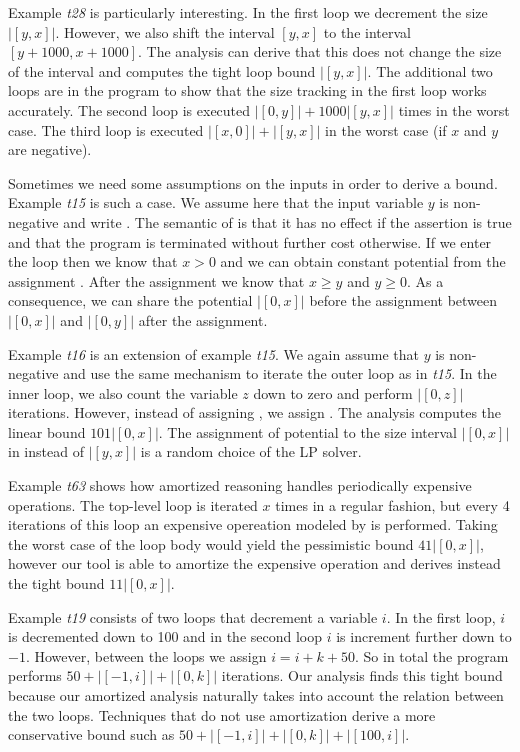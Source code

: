 \documentclass[nocopyrightspace,preprint,pldi]{sigplanconf-pldi15}
\newcommand{\iffull}[2]{\ifx\fullversion\undefined{#2}\else{#1}\fi}
\begin{document}
{Example \emph{t28} is particularly interesting.  In the first loop we
decrement the size $|[y,x]|$.  However, we also shift the interval
$[y,x]$ to the interval $[y+1000,x+1000]$.  The analysis can derive
that this does not change the size of the interval and computes the
tight loop bound $|[y,x]|$.  The additional two loops are in the
program to show that the size tracking in the first loop works
accurately.  The second loop is executed $|[0,y]| + 1000|[y,x]|$ times
in the worst case.  The third loop is executed $|[x,0]| + |[y,x]|$ in
the worst case (if $x$ and $y$ are negative).

Sometimes we need some assumptions on the inputs in order to derive a
bound.  Example \emph{t15} is such a case.  We assume here that the
input variable $y$ is non-negative and write .  The
semantic of  is that it has no effect if the assertion is
true and that the program is terminated without further cost
otherwise.  If we enter the loop then we know that $x>0$ and we can
obtain constant potential from the assignment .  After the
assignment we know that $x\geq y$ and $y\geq 0$.  As a consequence, we
can share the potential $|[0,x]|$ before the assignment 
between $|[0,x]|$ and $|[0,y]|$ after the assignment.  \iffull{In this way, we
derive a tight linear bound.}{}

Example \emph{t16} is an extension of example \emph{t15}. We again
assume that $y$ is non-negative and use the same mechanism to iterate
the outer loop as in \emph{t15}.  In the inner loop, we also count the
variable $z$ down to zero and perform $|[0,z]|$ iterations.  However,
instead of assigning , we assign .  The analysis
computes the linear bound $101|[0,x]|$.  The
assignment of potential to the size interval $|[0,x]|$ in instead of
$|[y,x]|$ is a random choice of the LP solver.

Example \emph{t63} shows how amortized reasoning handles periodically
expensive operations.  The top-level loop is iterated $x$ times in
a regular fashion, but every 4 iterations of this loop an expensive
opereation modeled by  is performed.  Taking the worst
case of the loop body would yield the pessimistic bound $41|[0,x]|$,
however our tool is able to amortize the expensive operation and derives
instead the tight bound $11|[0,x]|$.

Example \emph{t19} consists of two loops that decrement a variable
$i$.  In the first loop, $i$ is decremented down to 100 and in the
second loop $i$ is increment further down to $-1$.  However, between
the loops we assign $i=i+k+50$.  So in total the program performs $50
+ |[-1,i]| + |[0,k]|$ iterations.  Our analysis finds this tight bound
because our amortized analysis naturally takes into account the
relation between the two loops.  Techniques that do not use
amortization derive a more conservative bound such as $50 + |[-1,i]| +
|[0,k]| + |[100,i]|$.

}
\end{document}
